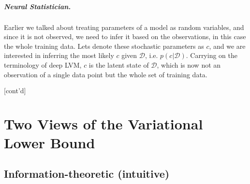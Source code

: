 \documentclass{article}
\begin{document}



\subparagraph{Neural Statistician.} Earlier we talked about treating parameters of a model as random variables, and since it is not observed, we need to infer it based on the observations, in this case the whole training data. 
Lets denote these stochastic parameters as $c$, and we are interested in inferring the most likely $c$ given $\mathcal{D}$, i.e. $p(c|\mathcal{D})$.
Carrying on the terminology of deep LVM, $c$ is the latent state of $\mathcal{D}$, which is now not an observation of a single data point but the whole set of training data.

[cont'd]















\section{Two Views of the Variational Lower Bound}



\subsection{Information-theoretic (intuitive)}
\end{document}
